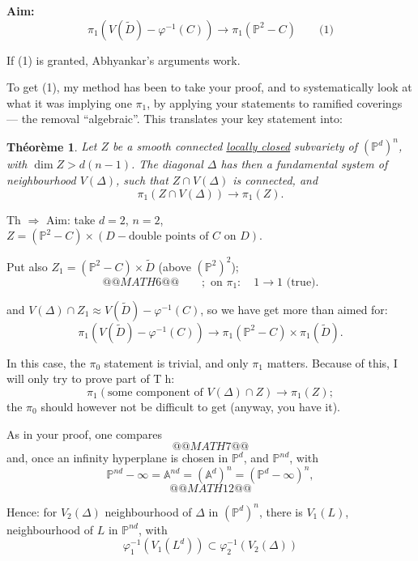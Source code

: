 \documentclass[11pt,a4paper]{article}
\theoremstyle{plain}
\newtheorem{theorem}{Th\'eor\`eme}
\theoremstyle{definition}
\begin{document}
\medskip

\noindent \textbf{Aim:}
\[
\pi_1(V(\widetilde{D}) - \varphi^{-1}(C)) \longrightarrow \pi_1(\mathbb{P}^2 - C) \qquad \text{(1)}
\]

If (1) is granted, Abhyankar's arguments work.

To get (1), my method has been to take your proof, and to systematically look at what it was implying one $\pi_1$, by applying your statements to ramified coverings --- the removal ``algebraic''. This translates your key statement into:

\begin{theorem}
Let $Z$ be a smooth connected \underline{locally closed} subvariety of $(\mathbb{P}^d)^n$, with $\dim Z > d(n-1)$. The diagonal $\Delta$ has then a fundamental system of neighbourhood $V(\Delta)$, such that $Z \cap V(\Delta)$ is connected, and
\[
\pi_1(Z \cap V(\Delta)) \longrightarrow \pi_1(Z).
\]
\end{theorem}

\medskip

Th $\Rightarrow$ Aim: take $d = 2$, $n = 2$, $Z = (\mathbb{P}^2 - C) \times (D - \text{double points of } C \text{ on } D)$.

Put also $Z_1 = (\mathbb{P}^2 - C) \times \widetilde{D}$ (above $(\mathbb{P}^2)^2$);
\[
@@MATH6@@
\qquad ; \text{ on } \pi_1: \quad 1 \longrightarrow 1 \text{ (true)}.
\]

and $V(\Delta) \cap Z_1 \approx V(\widetilde{D}) - \varphi^{-1}(C)$, so we have get more than aimed for:
\[
\pi_1(V(\widetilde{D}) - \varphi^{-1}(C)) \longrightarrow \pi_1(\mathbb{P}^2 - C) \times \pi_1(\widetilde{D}).
\]

\newpage

In this case, the $\pi_0$ statement is trivial, and only $\pi_1$ matters. Because of this, I will only try to prove part of \textcircled{Th}:
\[
\pi_1(\text{some component of } V(\Delta) \cap Z) \longrightarrow \pi_1(Z);
\]
the $\pi_0$ should however not be difficult to get (anyway, you have it).

\medskip

As in your proof, one compares
\[
@@MATH7@@
\]
and, once an infinity hyperplane is chosen in $\mathbb{P}^d$, and $\mathbb{P}^{nd}$, with
\[
\mathbb{P}^{nd} - \infty = \mathbb{A}^{nd} = (\mathbb{A}^d)^n = (\mathbb{P}^d - \infty)^n,
\]
\[
@@MATH12@@
\]

Hence: for $V_2(\Delta)$ neighbourhood of $\Delta$ in $(\mathbb{P}^d)^n$, there is $V_1(L)$, neighbourhood of $L$ in $\mathbb{P}^{nd}$, with
\[
\varphi_1^{-1}(V_1(L^d)) \subset \varphi_2^{-1}(V_2(\Delta))
\]
\end{document}

